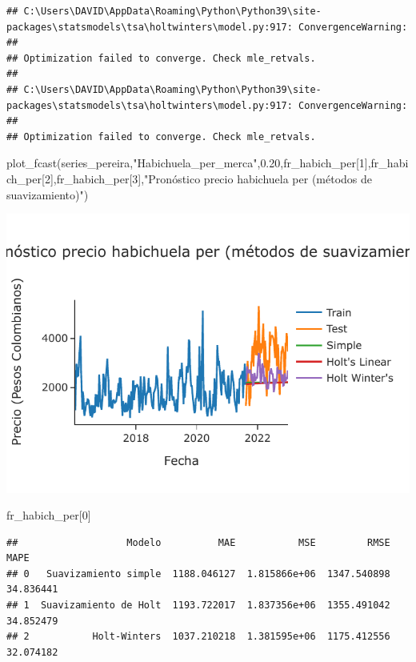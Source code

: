 \documentclass[
]{book}
\newenvironment{Shaded}{\begin{snugshade}}{\end{snugshade}}
\newcommand{\DecValTok}[1]{\textcolor[rgb]{0.00,0.00,0.81}{#1}}
\newcommand{\FloatTok}[1]{\textcolor[rgb]{0.00,0.00,0.81}{#1}}
\newcommand{\NormalTok}[1]{#1}
\newcommand{\StringTok}[1]{\textcolor[rgb]{0.31,0.60,0.02}{#1}}
\begin{document}
\begin{verbatim}
## C:\Users\DAVID\AppData\Roaming\Python\Python39\site-packages\statsmodels\tsa\holtwinters\model.py:917: ConvergenceWarning:
## 
## Optimization failed to converge. Check mle_retvals.
## 
## C:\Users\DAVID\AppData\Roaming\Python\Python39\site-packages\statsmodels\tsa\holtwinters\model.py:917: ConvergenceWarning:
## 
## Optimization failed to converge. Check mle_retvals.
\end{verbatim}

\begin{Shaded}
\begin{Highlighting}[]
\NormalTok{plot\_fcast(series\_pereira,}\StringTok{"Habichuela\_per\_merca"}\NormalTok{,}\FloatTok{0.20}\NormalTok{,fr\_habich\_per[}\DecValTok{1}\NormalTok{],fr\_habich\_per[}\DecValTok{2}\NormalTok{],fr\_habich\_per[}\DecValTok{3}\NormalTok{],}\StringTok{"Pronóstico precio habichuela per (métodos de suavizamiento)"}\NormalTok{)}
\end{Highlighting}
\end{Shaded}

\includegraphics{bookdown-demo_files/figure-latex/unnamed-chunk-144-131.pdf}

\begin{Shaded}
\begin{Highlighting}[]

\NormalTok{fr\_habich\_per[}\DecValTok{0}\NormalTok{]}
\end{Highlighting}
\end{Shaded}

\begin{verbatim}
##                   Modelo          MAE           MSE         RMSE       MAPE
## 0   Suavizamiento simple  1188.046127  1.815866e+06  1347.540898  34.836441
## 1  Suavizamiento de Holt  1193.722017  1.837356e+06  1355.491042  34.852479
## 2           Holt-Winters  1037.210218  1.381595e+06  1175.412556  32.074182
\end{verbatim}
\end{document}
